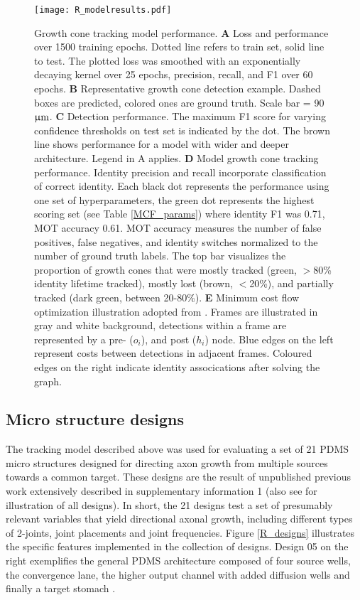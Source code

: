 \begin{figure}
    \texttt{[image: R\_modelresults.pdf]}
    \caption[Growth cone tracking model performance]
        {Growth cone tracking model performance. \textbf{A} Loss and performance
        over 1500 training epochs. Dotted line refers to train set, solid line
        to test. The plotted loss was smoothed with an exponentially decaying
        kernel over 25 epochs, precision, recall, and F1 over 60 epochs.
        \textbf{B} Representative growth cone detection example. Dashed boxes
        are predicted, colored ones are ground truth. Scale bar = 90 $\rm \upmu
        m$. \textbf{C} Detection performance. The maximum F1 score for varying
        confidence thresholds on test set is indicated by the dot. The brown
        line shows performance for a model with wider and deeper architecture.
        Legend in A applies. \textbf{D} Model growth cone tracking performance.
        Identity precision and recall incorporate classification of correct
        identity. Each black dot represents the performance using one set of
        hyperparameters, the green dot represents the highest scoring set (see
        Table \ref{MCF_params}) where identity F1 was 0.71, MOT accuracy 0.61.
        MOT accuracy measures the number of false positives, false negatives,
        and identity switches normalized to the number of ground truth labels.
        The top bar visualizes the proportion of growth cones that were mostly
        tracked (green, $>$80\% identity lifetime tracked), mostly lost (brown,
        $<$20\%), and partially tracked (dark green, between 20-80\%).
        \textbf{E} Minimum cost flow optimization illustration adopted from
        \parencite{MCF}. Frames are illustrated in gray and white background,
        detections within a frame are represented by a pre- ($o_i$), and post
        ($h_i$) node. Blue edges on the left represent costs between detections
        in adjacent frames. Coloured edges on the right indicate identity
        assocications after solving the graph. } 
    \label{R_modelresults}
\end{figure}


\subsection{Micro structure designs}
The tracking model described above was used for evaluating a set of 21 PDMS
micro structures designed for directing axon growth from multiple sources
towards a common target. These designs are the result of unpublished previous
work extensively described in supplementary information 1 (also see for
illustration of all designs). In short, the 21 designs test a set of presumably
relevant variables that yield directional axonal growth, including different
types of 2-joints, joint placements and joint frequencies. Figure
\ref{R_designs} illustrates the specific features implemented in the collection
of designs. Design 05 on the right exemplifies the general PDMS architecture
composed of four source wells, the convergence lane, the higher output channel
with added diffusion wells and finally a target stomach \parencite{forro}. 



